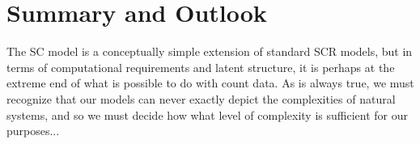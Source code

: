 \section{Summary and Outlook}

The SC model is a conceptually simple extension of standard SCR
models, but in terms of computational requirements and latent
structure, it is perhaps at the extreme end of what is possible to do
with count data. As is always true, we must recognize that
our models can never exactly depict the complexities of natural
systems, and so we must decide how what level of complexity is
sufficient for our purposes...


